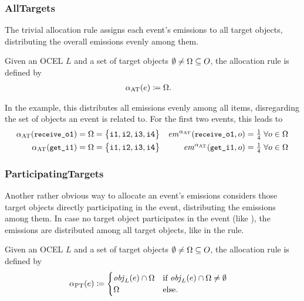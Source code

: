 \subsubsection*{AllTargets}
The trivial allocation rule assigns each event's emissions to all target objects, distributing the overall emissions evenly among them.

\begin{definition}
  Given an OCEL $L$ and a set of target objects $\emptyset\neq\Omega\subseteq O$,
  the  allocation rule is defined by
  \begin{align*}
    \alpha_\text{AT}(e)
    &\coloneqq \Omega.
  \end{align*}
  \label{def:AT}
\end{definition}

In the example, this distributes all emissions evenly among all items, disregarding the set of objects an event is related to. For the first two events, this leads to
\begin{align*}
  \alpha_\text{AT}(\texttt{{\small receive\_}o1}) &= \Omega = \bigl\{ \texttt{i1}, \texttt{i2}, \texttt{i3}, \texttt{i4} \bigr\} &
  \mathit{em}^{\alpha_\text{AT}}(\texttt{{\small receive\_}o1},o) &= \tfrac{1}{4} \;\forall o\in\Omega \\
  \alpha_\text{AT}(\texttt{{\small get\_}i1}) &= \Omega = \bigl\{ \texttt{i1}, \texttt{i2}, \texttt{i3}, \texttt{i4} \bigr\} &
  \mathit{em}^{\alpha_\text{AT}}(\texttt{{\small get\_}i1},o) &= \tfrac{1}{4} \;\forall o\in\Omega
\end{align*}

\subsubsection*{ParticipatingTargets}
Another rather obvious way to allocate an event's emissions considers those target objects directly participating in the event, distributing the emissions among them.
In case no target object participates in the event (like ), the emissions are distributed among all target objects, like in the  rule.

\begin{definition}
  Given an OCEL $L$ and a set of target objects $\emptyset\neq\Omega\subseteq O$,
  the  allocation rule is defined by
  \begin{align*}
    \alpha_\text{PT}(e)
    &\coloneqq \begin{cases}
      \mathit{obj}_L(e) \cap\Omega & \text{if } \mathit{obj}_L(e) \cap\Omega \neq\emptyset \\
      \Omega & \text{else}.
    \end{cases}
  \end{align*}
  \label{def:PT}
\end{definition}

